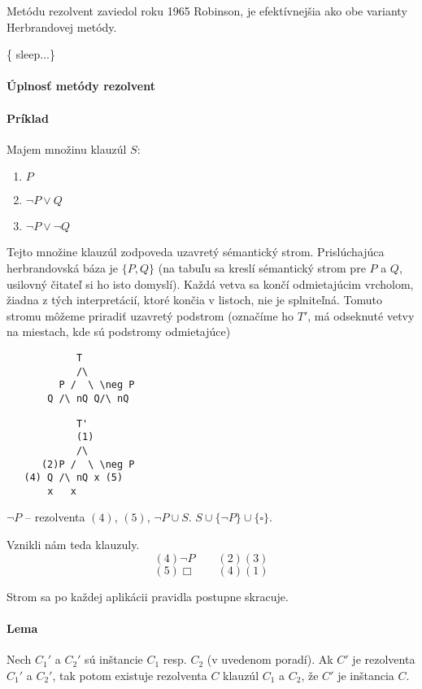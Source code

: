 \par  Metódu rezolvent zaviedol roku 1965 Robinson, je efektívnejšia ako obe
varianty Herbrandovej metódy. 

\par \{ sleep...\}

\paragraph{Úplnosť metódy rezolvent}

\paragraph{Príklad} Majem množinu klauzúl $S$:
\begin{enumerate}
	\item $P$
	\item $\neg P\lor Q$
	\item $\neg P \lor \neg Q$
\end{enumerate}
Tejto množine klauzúl zodpoveda uzavretý sémantický strom.
Prislúchajúca herbrandovská báza je $\{P, Q\}$ (na tabuľu sa kreslí sémantický
strom pre $P$ a $Q$, usilovný čitateľ si ho isto domyslí). Každá vetva sa končí
odmietajúcim vrcholom, žiadna z tých interpretácií, ktoré končia v listoch, nie
je splniteľná. Tomuto stromu môžeme priradiť uzavretý podstrom (označíme ho
$T'$,  má odseknuté vetvy na miestach, kde sú podstromy odmietajúce)


\begin{verbatim}
            T
            /\
         P /  \ \neg P
       Q /\ nQ Q/\ nQ 
\end{verbatim}

\begin{verbatim}
            T'
            (1)
            /\
      (2)P /  \ \neg P
   (4) Q /\ nQ x (5)
       x   x
\end{verbatim}

\par $\neg P$ -- rezolventa $(4)$, $(5)$, $\neg P \cup S$.  $S\cup \{ \neg P
\}\cup \{ \square \}$.

\par Vznikli nám teda klauzuly.
$$(4) \neg P\qquad (2) (3)$$
$$(5) \Box\qquad (4)(1)$$

\par Strom sa po každej aplikácii pravidla postupne skracuje. 

\paragraph{Lema} Nech $C_1'$ a $C_2'$ sú inštancie $C_1$ resp. $C_2$ (v uvedenom
poradí). Ak $C'$ je rezolventa $C_1'$ a $C_2'$, tak potom existuje rezolventa
$C$ klauzúl $C_1$ a $C_2$, že $C'$ je inštancia $C$. 

